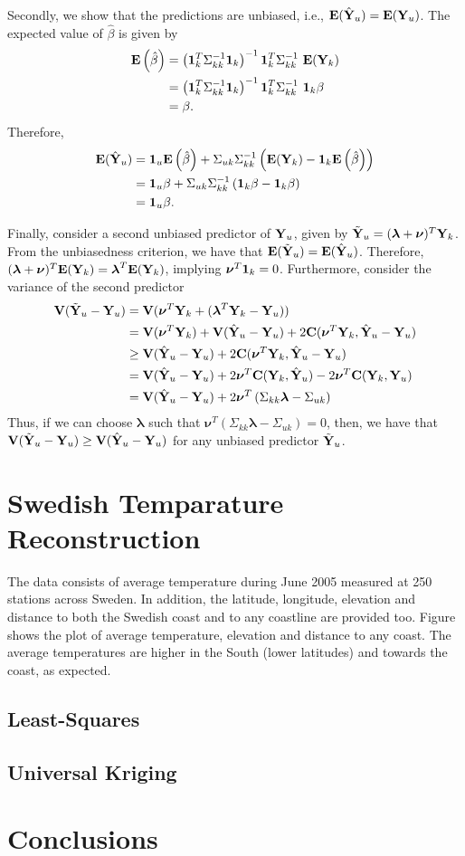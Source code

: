 \documentclass[a4paper,10pt]{article}
\def\bY{{\bf Y}}
\def\bE{{\bf E}}
\def\bV{{\bf V}}
\def\bC{{\bf C}}
\def\b1{{\bf 1}}
\def\blambda{{\boldsymbol \lambda}}
\def\bnu{{\boldsymbol \nu}}
\begin{document}
Secondly, we show that the predictions are unbiased, i.e., $\bE(\hat \bY_u) = \bE(\bY_u)$. The expected value of $\hat \beta$ is given by
\begin{align*}
 \bE \left( \hat \beta \right) &= \left( \b1_k^T \Sigma_{kk}^{-1} \b1_k \right)^{-1} \b1_k^T \Sigma_{kk}^{-1} ~ \bE (\bY_k) \\
  &= \left( \b1_k^T \Sigma_{kk}^{-1} \b1_k \right)^{-1} \b1_k^T \Sigma_{kk}^{-1} ~ \b1_k \beta \\
  &= \beta.
\end{align*}
Therefore,
\begin{align*}
 \bE(\hat \bY_u) &=  \b1_u \bE\left(\hat \beta \right) + \Sigma_{uk} \Sigma_{kk}^{-1}\left( \bE(\bY_k) - \b1_k \bE \left(\hat \beta \right)\right) \\
 &= \b1_u \beta + \Sigma_{uk} \Sigma_{kk}^{-1}\left( \b1_k \beta - \b1_k \beta \right) \\
 &= \b1_u \beta.
\end{align*}

Finally, consider a second unbiased predictor of $\bY_u$, given by $\tilde \bY_u = (\blambda + \bnu)^T \bY_k$. From the unbiasedness criterion, we have that $\bE(\tilde \bY_u) = \bE(\hat \bY_u)$. Therefore, $(\blambda + \bnu)^T \bE(\bY_k) = \blambda^T \bE(\bY_k)$, implying $\bnu^T \b1_k = 0$. Furthermore, consider the variance of the second predictor
\begin{align*}
 \bV(\tilde \bY_u - \bY_u) &= \bV(\bnu^T \bY_k + (\blambda^T \bY_k - \bY_u))\\
 &= \bV(\bnu^T \bY_k) + \bV(\hat \bY_u - \bY_u) + 2\bC(\bnu^T \bY_k, \hat \bY_u - \bY_u) \\
 &\ge \bV(\hat \bY_u - \bY_u) + 2\bC(\bnu^T \bY_k, \hat \bY_u - \bY_u)\\
 &= \bV(\hat \bY_u - \bY_u) + 2\bnu^T \bC(\bY_k, \hat \bY_u) - 2 \bnu^T \bC(\bY_k, \bY_u) \\
 &= \bV(\hat \bY_u - \bY_u) + 2\bnu^T \left(  \Sigma_{kk} \blambda - \Sigma_{uk}\right)
\end{align*}
Thus, if we can choose $\blambda$ such that $\bnu^T \left(  \Sigma_{kk} \blambda - \Sigma_{uk}\right) = 0$, then, we have that $\bV(\tilde \bY_u - \bY_u) \ge \bV(\hat \bY_u - \bY_u)$ for any unbiased predictor $\tilde \bY_u$.

\section{Swedish Temparature Reconstruction}
The data consists of average temperature during June 2005 measured at 250 stations across Sweden. In addition, the latitude, longitude, elevation and distance to both the Swedish coast and to any coastline are provided too. Figure~  shows the plot of average temperature, elevation and distance to any coast. The average temperatures are higher in the South (lower latitudes) and towards the coast, as expected.
\subsection{Least-Squares}

\subsection{Universal Kriging}

\section{Conclusions}
\end{document}
